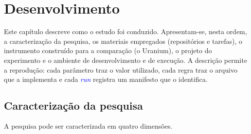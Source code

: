 \providecommand{\fonte}[1]{{\footnotesize[#1]}}
\providecommand{\novo}[1]{\textcolor{blue}{#1}}
\providecommand{\pedir}[1]{\textcolor{red}{[NÚMERO: pedir#1]}}
\newenvironment{novobloco}{\color{blue}}{}

\section{Desenvolvimento}
\label{desenvolvimento}

Este capítulo descreve como o estudo foi conduzido. Apresentam-se, nesta ordem, a caracterização da pesquisa, os materiais empregados (repositórios e tarefas), o instrumento construído para a comparação (o Uranium), o projeto do experimento e o ambiente de desenvolvimento e de execução. A descrição permite a reprodução: cada parâmetro traz o valor utilizado, cada regra traz o arquivo que a implementa e cada \novo{\textit{run}} registra um manifesto que o identifica.

\subsection{Caracterização da pesquisa}
\label{ssec:caracterizacao}

A pesquisa pode ser caracterizada em quatro dimensões.

